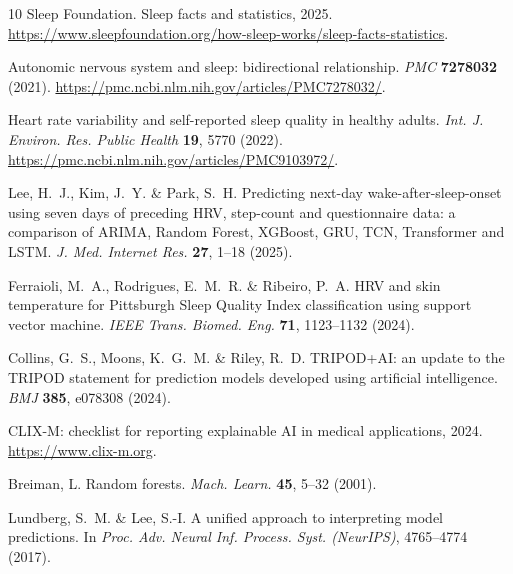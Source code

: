 \documentclass[fleqn,10pt]{wlscirep}
\begin{document}
\clearpage
\begin{thebibliography}{10}
Sleep Foundation. Sleep facts and statistics, 2025. \url{https://www.sleepfoundation.org/how-sleep-works/sleep-facts-statistics}.

Autonomic nervous system and sleep: bidirectional relationship. \emph{PMC} \textbf{7278032} (2021). \url{https://pmc.ncbi.nlm.nih.gov/articles/PMC7278032/}.

Heart rate variability and self-reported sleep quality in healthy adults. \emph{Int. J. Environ. Res. Public Health} \textbf{19}, 5770 (2022). \url{https://pmc.ncbi.nlm.nih.gov/articles/PMC9103972/}.

Lee, H.~J., Kim, J.~Y. \& Park, S.~H. Predicting next-day wake-after-sleep-onset using seven days of preceding HRV, step-count and questionnaire data: a comparison of ARIMA, Random Forest, XGBoost, GRU, TCN, Transformer and LSTM. \emph{J. Med. Internet Res.} \textbf{27}, 1--18 (2025).

Ferraioli, M.~A., Rodrigues, E.~M.~R. \& Ribeiro, P.~A. HRV and skin temperature for Pittsburgh Sleep Quality Index classification using support vector machine. \emph{IEEE Trans. Biomed. Eng.} \textbf{71}, 1123--1132 (2024).

Collins, G.~S., Moons, K.~G.~M. \& Riley, R.~D. TRIPOD+AI: an update to the TRIPOD statement for prediction models developed using artificial intelligence. \emph{BMJ} \textbf{385}, e078308 (2024).

CLIX-M: checklist for reporting explainable AI in medical applications, 2024. \url{https://www.clix-m.org}.

Breiman, L. Random forests. \emph{Mach. Learn.} \textbf{45}, 5--32 (2001).

Lundberg, S.~M. \& Lee, S.-I. A unified approach to interpreting model predictions. In \emph{Proc. Adv. Neural Inf. Process. Syst. (NeurIPS)}, 4765--4774 (2017).
\end{thebibliography}
\end{document}
